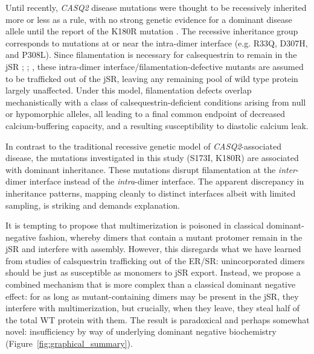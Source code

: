Until recently, \textit{CASQ2} disease mutations were thought to be recessively inherited more or less as a rule, with no strong genetic evidence for a dominant disease allele until the report of the K180R mutation \cite{Gray2016-kx}. The recessive inheritance group corresponds to mutations at or near the intra-dimer interface (e.g. R33Q, D307H, and P308L). Since filamentation is necessary for calsequestrin to remain in the jSR \cite{Milstein2009-ig}; \cite{McFarland2010-yi}; \cite{Knollmann2010-fl}, these intra-dimer interface/filamentation-defective mutants are assumed to be trafficked out of the jSR, leaving any remaining pool of wild type protein largely unaffected. Under this model, filamentation defects overlap mechanistically with a class of calsequestrin-deficient conditions arising from null or hypomorphic alleles, all leading to a final common endpoint of decreased calcium-buffering capacity, and a resulting susceptibility to diastolic calcium leak.  

In contrast to the traditional recessive genetic model of \textit{CASQ2}-associated disease, the mutations investigated in this study (S173I, K180R) are associated with dominant inheritance. These mutations disrupt filamentation at the \textit{inter}-dimer interface instead of the \textit{intra}-dimer interface. The apparent discrepancy in inheritance patterns, mapping cleanly to distinct interfaces albeit with limited sampling, is striking and demands explanation. 
\begin{hlbreakable}
It is tempting to propose that multimerization is poisoned in classical dominant-negative fashion, whereby dimers that contain a mutant protomer remain in the jSR and interfere with assembly. However, this disregards what we have learned from studies of calsquestrin trafficking out of the ER/SR: unincorporated dimers should be just as susceptible as monomers to jSR export. Instead, we propose a combined mechanism that is more complex than a classical dominant negative effect: for as long as mutant-containing dimers may be present in the jSR, they interfere with multimerization, but crucially, when they leave, they steal half of the total WT protein with them. The result is paradoxical and perhaps somewhat novel: insufficiency by way of underlying dominant negative biochemistry (Figure~\ref{fig:graphical_summary}).
\end{hlbreakable}

